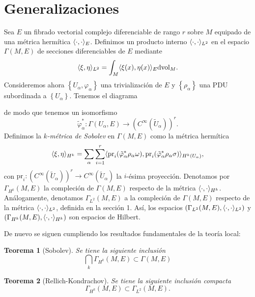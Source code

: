 \documentclass[12pt,a4paper]{article}
\newtheorem{thm}{Teorema}[section]
\theoremstyle{definition} \newtheorem{defn}[thm]{Definición}
\theoremstyle{definition} \newtheorem{ejemplo}[thm]{Ejemplo}
\theoremstyle{definition} \newtheorem{ejercicio}[thm]{Ejercicio}
\theoremstyle{remark} \newtheorem*{obs}{Observación}
\DeclarePairedDelimiter\esc{\langle}{\rangle}
\newcommand{\dvol}{\mathrm{dvol}}
\newcommand{\CC}{\mathbb{C}}
\newcommand{\pr}{\mathrm{pr}}
\begin{document}
  \section{Generalizaciones}
  Sea $E$ un fibrado vectorial complejo diferenciable de rango $r$ sobre $M$ equipado de una métrica hermítica $\esc{\cdot,\cdot}_E$. Definimos un producto interno $\esc{\cdot,\cdot}_{L^2}$ en el espacio $\Gamma(M,E)$ de secciones diferenciables de $E$ mediante
  \begin{equation*}
    \esc{\xi,\eta}_{L^2}=\int_{M} \esc{\xi(x),\eta(x)}_E \dvol_M.
  \end{equation*}
  Consideremos ahora $\left\{ U_\alpha,\varphi_\alpha \right\}$ una trivialización de $E$ y $\left\{ \rho_\alpha \right\}$ una PDU subordinada a $\left\{ U_{\alpha} \right\}$. 
Tenemos el diagrama
  \begin{center}
   \end{center}
   de modo que tenemos un isomorfismo
   \begin{equation*}
     \tilde{\varphi}_\alpha^*:\Gamma(U_\alpha,E) \rightarrow (C^\infty(\tilde{U}_{\alpha}))^r.
   \end{equation*}
   Definimos la \emph{$k$-métrica de Sobolev} en $\Gamma(M,E)$ como la métrica hermítica
   \begin{equation*}
     \esc{\xi,\eta}_{H^k}=\sum_\alpha \sum_{i=1}^r \esc{\pr_i (\tilde{\varphi}_\alpha^* \rho_\alpha \omega),\pr_i(\tilde{\varphi}_\alpha^* \rho_\alpha \sigma)}_{H^k(U_\alpha)},
   \end{equation*}
   con $\pr_i: (C^\infty(\tilde{U}_\alpha))^r \rightarrow C^\infty(\tilde{U}_\alpha)$ la $i$-ésima proyección. 
   Denotamos por $\Gamma_{H^k}(M,E)$ la compleción de $\Gamma(M,E)$ respecto de la métrica $\esc{\cdot,\cdot}_{H^k}$. Análogamente, denotamos $\Gamma_{L^2}(M,E)$ a la compleción de $\Gamma(M,E)$ respecto de la métrica $\esc{\cdot,\cdot}_{L^2}$, definida en la sección 1. Así, los espacios $(\Gamma_{L^2}(M,E),\esc{\cdot,\cdot}_{L^2})$ y $(\Gamma_{H^k}(M,E),\esc{\cdot,\cdot}_{H^k})$ son espacios de Hilbert.
   
   De nuevo se siguen cumpliendo los resultados fundamentales de la teoría local:
   \begin{thm}[Sobolev]
     Se tiene la siguiente inclusión
     \begin{equation*}
     \bigcap_k\Gamma_{H^k}(M,E)\subset \Gamma(M,E)
     \end{equation*}
   \end{thm}
   \begin{thm}[Rellich-Kondrachov]
  Se tiene la siguiente inclusión compacta  $$\Gamma_{H^k}(M,E) \subset \Gamma_{L^2}(M,E).$$ 
   \end{thm}
\end{document}
